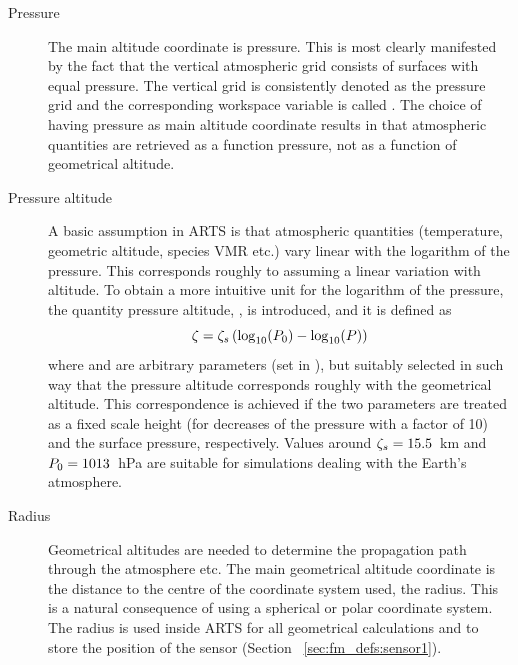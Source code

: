 \label{sec:fm_defs:altitudes}

\begin{description}
  
\item[Pressure] The main altitude coordinate is
  pressure. This is most clearly manifested by the fact that the
  vertical atmospheric grid consists of surfaces with equal pressure.
  The vertical grid is consistently denoted as the pressure grid and
  the corresponding workspace variable is called . The
  choice of having pressure as main altitude coordinate results in
  that atmospheric quantities are retrieved as a function pressure,
  not as a function of geometrical altitude.
  
\item[Pressure altitude] A basic assumption
  in ARTS is that atmospheric quantities (temperature, geometric
  altitude, species VMR etc.) vary linear with the logarithm of the
  pressure. This corresponds roughly to assuming a linear variation
  with altitude. To obtain a more intuitive unit for the logarithm of
  the pressure, the quantity pressure altitude, \PrsAlt, is
  introduced, and it is defined as
  \begin{equation}
   \zeta = \zeta_{s}\left( \log_{10}(P_{0}) - \log_{10}(P) \right)
   \label{eq:fm_defs:prsalt}
  \end{equation}
  where  and  are arbitrary parameters (set in
  ), but suitably selected in such way that the pressure
  altitude corresponds roughly with the geometrical altitude.  This
  correspondence is achieved if the two parameters are treated as a
  fixed scale height (for decreases of the pressure with a factor of
  10) and the surface pressure, respectively. Values around
  $\zeta_{s}=15.5$~km and $P_{0}=1013$~hPa are suitable for
  simulations dealing with the Earth's atmosphere.
  
\item[Radius] Geometrical altitudes are
  needed to determine the propagation path through the atmosphere etc.
  The main geometrical altitude coordinate is the distance to the
  centre of the coordinate system used, the radius. This is a natural
  consequence of using a spherical or polar coordinate system. The
  radius is used inside ARTS for all geometrical calculations and to
  store the position of the sensor (Section~
  \ref{sec:fm_defs:sensor1}).
  

\end{description}
